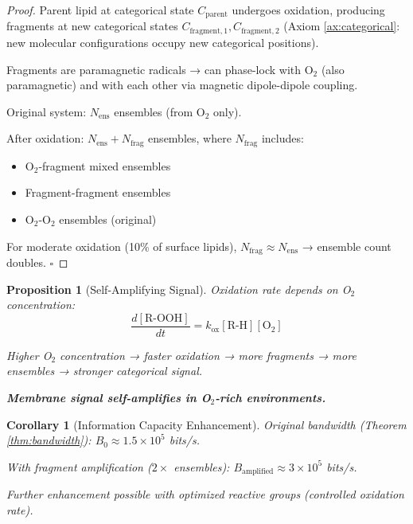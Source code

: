 \documentclass[11pt,a4paper]{article}
\newtheorem{proposition}[theorem]{Proposition}
\newtheorem{corollary}[theorem]{Corollary}
\theoremstyle{definition}
\theoremstyle{remark}
\begin{document}
\begin{proof}
Parent lipid at categorical state $C_{\text{parent}}$ undergoes oxidation, producing fragments at new categorical states $C_{\text{fragment},1}, C_{\text{fragment},2}$ (Axiom \ref{ax:categorical}: new molecular configurations occupy new categorical positions).

Fragments are paramagnetic radicals → can phase-lock with O$_2$ (also paramagnetic) and with each other via magnetic dipole-dipole coupling.

Original system: $N_{\text{ens}}$ ensembles (from O$_2$ only).

After oxidation: $N_{\text{ens}} + N_{\text{frag}}$ ensembles, where $N_{\text{frag}}$ includes:
\begin{itemize}
\item O$_2$-fragment mixed ensembles
\item Fragment-fragment ensembles
\item O$_2$-O$_2$ ensembles (original)
\end{itemize}

For moderate oxidation (10\% of surface lipids), $N_{\text{frag}} \approx N_{\text{ens}}$ → ensemble count doubles. $\square$
\end{proof}

\begin{proposition}[Self-Amplifying Signal]
Oxidation rate depends on O$_2$ concentration:
\begin{equation}
\frac{d[\text{R-OOH}]}{dt} = k_{\text{ox}}[\text{R-H}][\text{O}_2]
\end{equation}

Higher O$_2$ concentration → faster oxidation → more fragments → more ensembles → stronger categorical signal.

\textbf{Membrane signal self-amplifies in O$_2$-rich environments.}
\end{proposition}

\begin{corollary}[Information Capacity Enhancement]
Original bandwidth (Theorem \ref{thm:bandwidth}): $B_0 \approx 1.5 \times 10^5$ bits/s.

With fragment amplification ($2\times$ ensembles): $B_{\text{amplified}} \approx 3 \times 10^5$ bits/s.

Further enhancement possible with optimized reactive groups (controlled oxidation rate).
\end{corollary}
\end{document}
